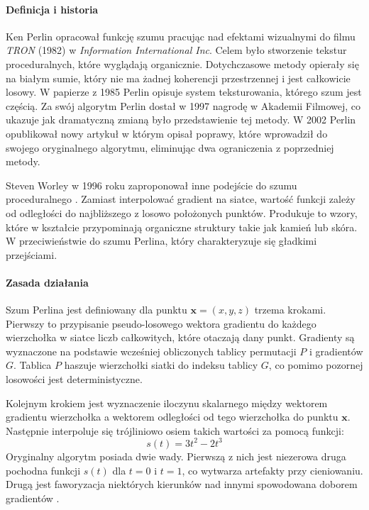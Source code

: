 \paragraph{Definicja i historia}
Ken Perlin opracował funkcję szumu pracując nad efektami wizualnymi do filmu \textit{TRON} (1982) w \textit{Information International Inc}. Celem było stworzenie tekstur proceduralnych, które wyglądają organicznie. Dotychczasowe metody opierały się na białym sumie, który nie ma żadnej koherencji przestrzennej i jest całkowicie losowy. W papierze \cite{perlin1985} z 1985 Perlin opisuje system teksturowania, którego szum jest częścią. Za swój algorytm Perlin dostał w 1997 nagrodę w Akademii Filmowej, co ukazuje jak dramatyczną zmianą było przedstawienie tej metody. W 2002 Perlin opublikował nowy artykuł \cite{perlin2002} w którym opisał poprawy, które wprowadził do swojego oryginalnego algorytmu, eliminując dwa ograniczenia z poprzedniej metody.

Steven Worley w 1996 roku zaproponował inne podejście do szumu proceduralnego \cite{worley1996}. Zamiast interpolować gradient na siatce, wartość funkcji zależy od odległości do najbliższego z losowo położonych punktów. Produkuje to wzory, które w kształcie przypominają organiczne struktury takie jak kamień lub skóra. W przeciwieństwie do szumu Perlina, który charakteryzuje się gładkimi przejściami.

\paragraph{Zasada działania}
Szum Perlina jest definiowany dla punktu $\mathbf{x} = (x, y, z)$ trzema krokami. Pierwszy to przypisanie pseudo-losowego wektora gradientu do każdego wierzchołka w siatce liczb całkowitych, które otaczają dany punkt. Gradienty są wyznaczone na podstawie wcześniej obliczonych tablicy permutacji $P$ i gradientów $G$. Tablica $P$ haszuje wierzchołki siatki do indeksu tablicy $G$, co pomimo pozornej losowości jest deterministyczne.

Kolejnym krokiem jest wyznaczenie iloczynu skalarnego między wektorem gradientu wierzchołka a wektorem odległości od tego wierzchołka do punktu $\mathbf{x}$. Następnie interpoluje się trójliniowo osiem takich wartości za pomocą funkcji:
\begin{equation}
    s(t) = 3t^2 - 2t^3
\end{equation}
Oryginalny algorytm posiada dwie wady. Pierwszą z nich jest niezerowa druga pochodna funkcji $s(t)$ dla $t=0$ i $t=1$, co wytwarza artefakty przy cieniowaniu. Drugą jest faworyzacja niektórych kierunków nad innymi spowodowana doborem gradientów \cite{perlin2002}.

